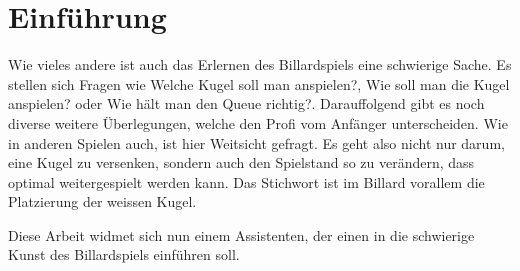 \chapter{Einführung}
Wie vieles andere ist auch das Erlernen des Billardspiels eine schwierige Sache. Es stellen sich Fragen wie \glqq Welche
Kugel soll man anspielen?\grqq{}, \glqq Wie soll man die Kugel anspielen?\grqq{} oder \glqq Wie hält man den Queue richtig?\grqq{}.
Darauffolgend gibt es noch diverse weitere Überlegungen, welche den Profi vom Anfänger unterscheiden. Wie in anderen Spielen
auch, ist hier Weitsicht gefragt. Es geht also nicht nur darum, eine Kugel zu versenken, sondern auch den Spielstand so zu
verändern, dass optimal weitergespielt werden kann. Das Stichwort ist im Billard vorallem die Platzierung der weissen Kugel.

Diese Arbeit widmet sich nun einem Assistenten, der einen in die schwierige Kunst des Billardspiels einführen soll.